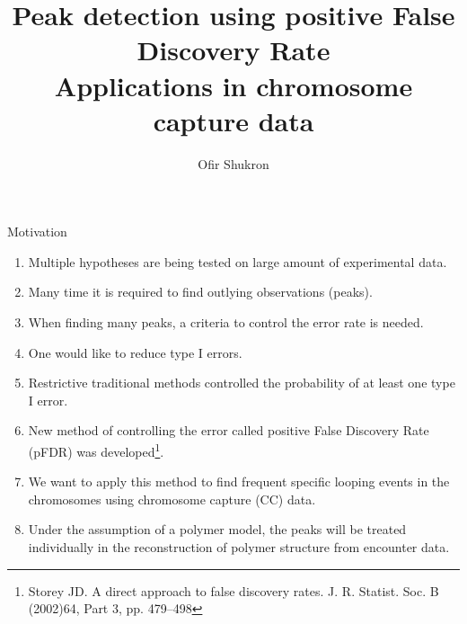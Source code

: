 \documentclass[8pt]{beamer}
\title{Peak detection using positive False Discovery Rate\\
Applications in chromosome capture data}
\author{Ofir Shukron}
\begin{document}
\begin{frame}
\titlepage
\end{frame}

\begin{frame}{Motivation}
\begin{enumerate}
\item Multiple hypotheses are being tested on large amount of experimental data. 
\item Many time it is required to find outlying observations (peaks). 
\item When finding many peaks, a criteria to control the error rate is needed.
\item One would like to reduce type I errors. 
\item Restrictive traditional methods controlled the probability of at least one type I error.
\item New method of controlling the error called positive False Discovery Rate (pFDR) was developed\footnote{Storey JD. A direct approach to false discovery rates. J. R. Statist. Soc. B (2002)64, Part 3, pp. 479–498}. 
\item We want to apply this method to find frequent specific looping events in the chromosomes using chromosome capture (CC) data.
\item Under the assumption of a polymer model, the peaks will be treated individually in the reconstruction of polymer structure from encounter data.
\end{enumerate}
\end{frame}
\end{document}
